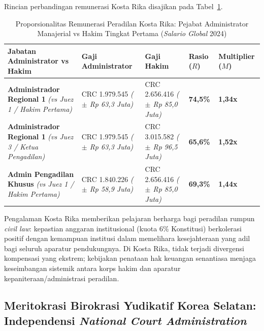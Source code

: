 \documentclass[12pt, a4paper]{article}
\begin{document}
Rincian perbandingan remunerasi Kosta Rika disajikan pada Tabel~\ref{tab:komparasi-kostarika-lengkap}.

\begin{table}[H]
\centering
\fontsize{9}{11}\selectfont
\caption{Proporsionalitas Remunerasi Peradilan Kosta Rika: Pejabat Administrator Manajerial vs Hakim Tingkat Pertama (\textit{Salario Global} 2024)}
\label{tab:komparasi-kostarika-lengkap}
\renewcommand{\arraystretch}{1.35}
\begin{tabular}{p{5.0cm} p{2.7cm} p{2.7cm} p{1.7cm} p{1.7cm}}
\hline
\textbf{Jabatan Administrator vs Hakim} & \textbf{Gaji Administrator} & \textbf{Gaji Hakim} & \textbf{Rasio ($R$)} & \textbf{Multiplier ($M$)} \tabularnewline
\hline
\raggedright\textbf{Administrador Regional 1} \newline \textit{(vs Juez 1 / Hakim Pertama)} & CRC 1.979.545 \newline \textit{($\pm$ Rp 63,3 Juta)} & CRC 2.656.416 \newline \textit{($\pm$ Rp 85,0 Juta)} & \textbf{74,5\%} & \textbf{1,34x} \tabularnewline
\raggedright\textbf{Administrador Regional 1} \newline \textit{(vs Juez 3 / Ketua Pengadilan)} & CRC 1.979.545 \newline \textit{($\pm$ Rp 63,3 Juta)} & CRC 3.015.582 \newline \textit{($\pm$ Rp 96,5 Juta)} & \textbf{65,6\%} & \textbf{1,52x} \tabularnewline
\raggedright\textbf{Admin Pengadilan Khusus} \newline \textit{(vs Juez 1 / Hakim Pertama)} & CRC 1.840.226 \newline \textit{($\pm$ Rp 58,9 Juta)} & CRC 2.656.416 \newline \textit{($\pm$ Rp 85,0 Juta)} & \textbf{69,3\%} & \textbf{1,44x} \tabularnewline
\hline
\end{tabular}
\end{table}

Pengalaman Kosta Rika memberikan pelajaran berharga bagi peradilan rumpun \textit{civil law}: kepastian anggaran institusional (kuota 6\% Konstitusi) berkolerasi positif dengan kemampuan institusi dalam memelihara kesejahteraan yang adil bagi seluruh aparatur pendukungnya. Di Kosta Rika, tidak terjadi divergensi kompensasi yang ekstrem; kebijakan penataan hak keuangan senantiasa menjaga keseimbangan sistemik antara korps hakim dan aparatur kepaniteraan/administrasi peradilan.

\subsection{Meritokrasi Birokrasi Yudikatif Korea Selatan: Independensi \textit{National Court Administration}}
\end{document}
